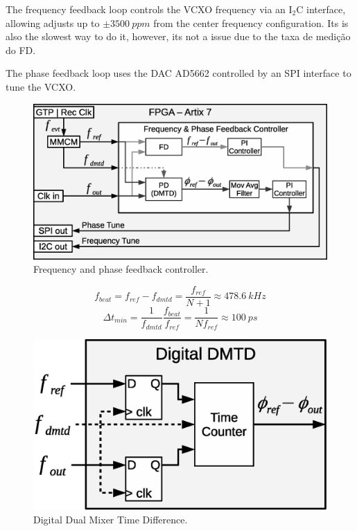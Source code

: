 \documentclass[a4paper,
               biblatex,      %
               ]{jacow}
\begin{document}
The frequency feedback loop controls the VCXO frequency via an I$_{2}$C interface, allowing adjusts up to $\pm3500~ppm$ from the center frequency configuration. Its is also the slowest way to do it, however, its not a issue due to the taxa de medição do FD.

The phase feedback loop uses the DAC AD5662 controlled by an SPI interface to tune the VCXO. 

\begin{figure}[!htb]
   \centering
   \includegraphics*[width=0.8\columnwidth]{AFCFPGADMTD}
   \caption{Frequency and phase feedback controller.}
   \label{fig:AFCFPGADMTD}
\end{figure}

\[f_{beat} = f_{ref}-f_{dmtd} = \frac{f_{ref}}{N+1} \approx 478.6~kHz\]
\[\Delta t_{min} = \frac{1}{f_{dmtd}}\frac{f_{beat}}{f_{ref}} = \frac{1}{Nf_{ref}} \approx 100~ps\]

\begin{figure}[!htb]
   \centering
   \includegraphics*[width=0.8\columnwidth]{DigitalDMTD}
   \caption{Digital Dual Mixer Time Difference.}
   \label{fig:DigitalDMTD}
\end{figure}
\end{document}
